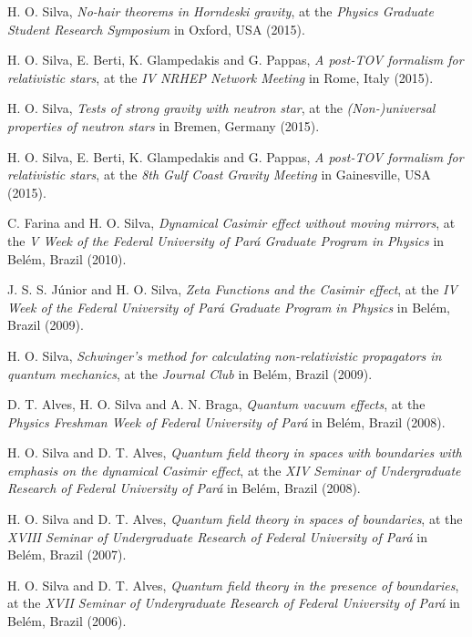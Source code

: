 \documentclass[10pt]{article}
\begin{document}
\begin{bibenum}
    \item H. O. Silva,
    \emph{No-hair theorems in Horndeski gravity},
    at the \emph{Physics Graduate Student Research Symposium}
    in Oxford, USA (2015).

    \item H. O. Silva, E. Berti, K. Glampedakis and G. Pappas,
    \emph{A post-TOV formalism for relativistic stars},
    at the \emph{IV NRHEP Network Meeting}
    in Rome, Italy (2015).

    \item H. O. Silva,
    \emph{Tests of strong gravity with neutron star},
    at the \emph{(Non-)universal properties of neutron stars}
    in Bremen, Germany (2015).

    \item H. O. Silva, E. Berti, K. Glampedakis and G. Pappas,
    \emph{A post-TOV formalism for relativistic stars},
    at the \emph{8th Gulf Coast Gravity Meeting}
    in Gainesville, USA (2015).

    \item C. Farina and H. O. Silva,
    \emph{Dynamical Casimir effect without moving mirrors},
    at the \emph{V Week of the Federal University of Par\'a Graduate Program in Physics}
    in Bel\'em, Brazil (2010).

    \item J. S. S. J\'unior and H. O. Silva,
    \emph{Zeta Functions and the Casimir effect},
    at the \emph{IV Week of the Federal University of Par\'a Graduate Program in Physics}
    in Bel\'em, Brazil (2009).

    \item H. O. Silva,
    \emph{Schwinger's method for calculating non-relativistic
    propagators in quantum mechanics},
    at the \emph{Journal Club}
    in Bel\'em, Brazil (2009).

    \item D. T. Alves, H. O. Silva and A. N. Braga,
    \emph{Quantum vacuum effects},
    at the \emph{Physics Freshman Week of Federal University of Par\'a}
    in Bel\'em, Brazil (2008).

    \item H. O. Silva and D. T. Alves,
    \emph{Quantum field theory in spaces with boundaries
    with emphasis on the dynamical Casimir effect},
    at the \emph{XIV Seminar of Undergraduate Research of
    Federal University of Par\'a}
    in Bel\'em, Brazil (2008).

    \item H. O. Silva and D. T. Alves,
    \emph{Quantum field theory in spaces of boundaries},
    at the \emph{XVIII Seminar of Undergraduate Research of
    Federal University of Par\'a}
    in Bel\'em, Brazil (2007).

    \item H. O. Silva and D. T. Alves,
    \emph{Quantum field theory in the presence of boundaries},
    at the \emph{XVII Seminar of Undergraduate Research of
    Federal University of Par\'a}
    in Bel\'em, Brazil (2006).
\end{bibenum}
\end{document}
